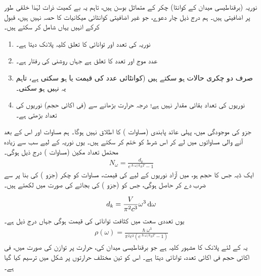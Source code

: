 
نوریہ (برقناطیسی میدان کے کوانٹا) چکر  کے متماثل بوسن ہیں، تاہم یہ بے کمیت ذرات لہٰذا خلقی طور پر اضافیتی ہیں۔ ہم درج ذیل چار دعوے، جو غیر اضافیتی کوانٹائی میکانیات کا حصہ نہیں ہیں، قبول کرکے انہیں یہاں شامل کر سکتے ہیں۔
\begin{enumerate}[1.]
\item
 نوریہ کی تعدد اور توانائی کا تعلق کلیہ پلانک  دیتا ہے۔
\item 
 عدد موج  اور تعدد کا تعلق  ہے جہاں  روشنی کی رفتار ہے۔
 \item
صرف دو چکری حالات ہو سکتے ہیں (کوانٹائی عدد  کی قیمت  یا  ہو سکتی ہے، تاہم یہ  نہیں ہو سکتی۔
\item 
 نوریوں کی تعداد بقائی مقدار نہیں ہے؛ درجہ حرارت بڑھانے سے (فی اکائی حجم) نوریوں کی تعداد بڑھتی ہے۔
\end{enumerate} 
 
 جزو  کی موجودگی میں، پہلی عائد پابندی (مساوات ) کا اطلاق نہیں ہوگا۔ ہم مساوات  اور اس کے بعد آنے والی مساواتوں میں  لے کر اس شرط کو ختم کر سکتے ہیں۔ یوں نوریہ کے لیے سب سے زیادہ محتمل تعداد مکین (مساوات ) درج ذیل ہوگی۔ 
\begin{align}\label{مساوات_مماثل_عدد_مکین}
N_{\omega} = \frac{d_k}{e^{\hslash \omega / k_B T} - 1}
\end{align}
ایک ڈبہ جس کا حجم  ہو، میں آزاد نوریوں کے لیے  کی قیمت، مساوات  کو چکر (جزو ) کی بنا پر  سے ضرب دے کر حاصل ہوگی، جس کو  (جزو ) کی بجائے  کی صورت میں لکھتے ہیں۔ 

\begin{align} 
d_k = \frac{V}{\pi^2 c^3} \omega^3 \dif \omega
\end{align}
یوں تعددی سعت  میں کثافت توانائی  کی قیمت  ہوگی جہاں  درج ذیل ہے۔
\begin{align}\label{مساوات_متماثل_سیاہ_جسمی_طیف}
\rho (\omega) = \frac{\hslash \omega^3}{\pi^2 c^3 (e^{\hslash \omega / k_B T} - 1)}
\end{align}
یہ  کے لئے پلانک کا مشہور کلیہ ہے جو برقناطیسی میدان کی، حرارت  پر توازن کی صورت میں، فی اکائی حجم فی اکائی تعدد، توانائی دیتا ہے۔ اس کو تین مختلف حرارتوں پر شکل  میں ترسیم کیا گیا ہے۔ 

